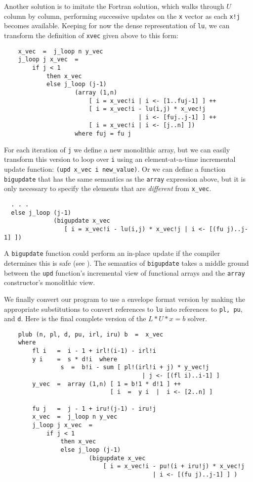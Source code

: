 Another solution is to imitate the Fortran solution, which walks through
$U$ column by column, performing successive updates on the {\tt x}
vector as each {\tt x!j} becomes available.  Keeping for now the dense
representation of {\tt lu}, we can transform the definition of
{\tt xvec} given above to this form:
\begin{verbatim}
    x_vec  =  j_loop n y_vec
    j_loop j x_vec  =
        if j < 1
            then x_vec
            else j_loop (j-1)
                    (array (1,n)
                        [ i = x_vec!i | i <- [1..fuj-1] ] ++
                        [ i = x_vec!i - lu(i,j) * x_vec!j
                                      | i <- [fuj..j-1] ] ++
                        [ i = x_vec!i | i <- [j..n] ])
                    where fuj = fu j
\end{verbatim}
For each iteration of {\tt j} we define a new monolithic array, but we can
easily transform this version to loop over {\tt i} using an
element-at-a-time incremental update function:
{\tt (upd x\_vec i new\_value)}.
Or we can define a function {\tt bigupdate} that has the same
semantics as the {\tt array} expression above, but it is only
necessary to specify the elements that are {\em different} from
{\tt x\_vec}.
\begin{verbatim}
  . . .
  else j_loop (j-1)
              (bigupdate x_vec
                 [ i = x_vec!i - lu(i,j) * x_vec!j | i <- [(fu j)..j-1] ])
\end{verbatim}
A {\tt bigupdate} function could perform an in-place update if the
compiler determines this is safe (see \cite{ande89,ande89b}).
The semantics of {\tt bigupdate} takes a middle ground between the
{\tt upd} function's incremental view of functional arrays and the
{\tt array} constructor's monolithic view.

We finally convert our program to use a envelope format version 
by making the appropriate substitutions to convert references
to {\tt lu} into references to {\tt pl, pu}, and {\tt d}.
Here is the final complete version of the $L*U*x = b$ solver.

\begin{verbatim}
    plub (n, pl, d, pu, irl, iru) b  =  x_vec
    where
        fl i   =  i - 1 + irl!(i-1) - irl!i
        y i    =  s * d!i  where
                s  =  b!i - sum [ pl!(irl!i + j) * y_vec!j
                                       | j <- [(fl i)..i-1] ]
        y_vec  =  array (1,n) [ 1 = b!1 * d!1 ] ++ 
                              [ i  =  y i  |  i <- [2..n] ]

        fu j   =  j - 1 + iru!(j-1) - iru!j
        x_vec  =  j_loop n y_vec
        j_loop j x_vec  =
            if j < 1
                then x_vec
                else j_loop (j-1)
                        (bigupdate x_vec
                            [ i = x_vec!i - pu!(i + iru!j) * x_vec!j
                                          | i <- [(fu j)..j-1] ] )
\end{verbatim}

